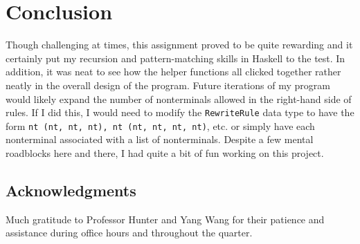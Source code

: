 \documentclass[12pt, letterpaper]{article}
\begin{document}
\section{Conclusion} 
Though challenging at times, this assignment proved to be quite rewarding and it certainly put my recursion and pattern-matching skills in Haskell to the test. In addition, it was neat to see how the helper functions all clicked together rather neatly in the overall design of the program.  Future iterations of my program would likely expand the number of nonterminals allowed in the right-hand side of rules. If I did this, I would need to modify the \verb|RewriteRule| data type to have the form \verb|nt (nt, nt, nt), nt (nt, nt, nt, nt)|, etc. or simply have each nonterminal associated with a list of nonterminals. Despite a few mental roadblocks here and there, I had quite a bit of fun working on this project. 	

\subsection*{Acknowledgments}
Much gratitude to Professor Hunter and Yang Wang for their patience and assistance during office hours and throughout the quarter. 
\end{document}
